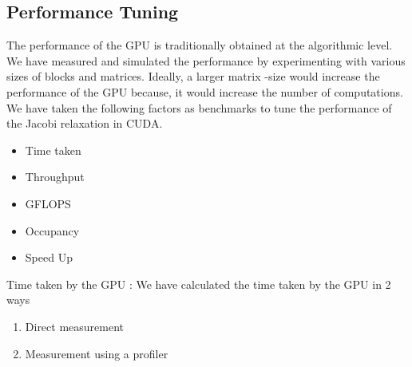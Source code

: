 \documentclass[10pt, twocolumn]{article}
\begin{document}
    \subsection{Performance Tuning}
    The performance of the GPU is traditionally obtained at the algorithmic level.
    We have measured and simulated the performance by experimenting with various sizes of blocks and matrices.
    Ideally, a larger matrix -size would increase the performance of the GPU because,  it would increase  the  number of computations.
    We have taken the following factors as benchmarks to tune the performance of the Jacobi relaxation in CUDA.
    \begin{itemize}
    \item Time taken
    \item Throughput
    \item GFLOPS
    \item Occupancy
    \item Speed Up
    \end{itemize}
    Time taken by the GPU  : We have calculated the time taken by the GPU in 2 ways
    \begin{enumerate}
    \item Direct measurement
    \item Measurement using a profiler
    \end{enumerate}
\end{document}
